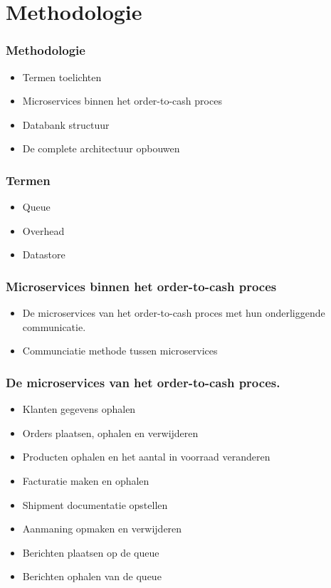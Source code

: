 \documentclass[aspectratio=169]{beamer}
\begin{document}
\section{Methodologie}

\begin{frame}
	\frametitle{Methodologie}
	\begin{itemize}
		\item Termen toelichten
		\item Microservices binnen het order-to-cash proces
		\item Databank structuur
		\item De complete architectuur opbouwen
	\end{itemize}

\end{frame}

\begin{frame}
	\frametitle{Termen}
	\begin{itemize}
		\item Queue
		\item Overhead
		\item Datastore
	\end{itemize}

\end{frame}

\begin{frame}
	\frametitle{Microservices binnen het order-to-cash proces}
	\begin{itemize}
		\item De microservices van het order-to-cash proces met hun onderliggende communicatie.
		\item Communciatie methode tussen microservices
	\end{itemize}
\end{frame}

\begin{frame}
	\frametitle{De microservices van het order-to-cash proces.}
	\begin{itemize}
		\item Klanten gegevens ophalen
		\item Orders plaatsen, ophalen en verwijderen
		\item Producten ophalen en het aantal in voorraad veranderen
		\item Facturatie maken en ophalen
		\item Shipment documentatie opstellen
		\item Aanmaning opmaken en verwijderen
		\item Berichten plaatsen op de queue
		\item Berichten ophalen van de queue
	\end{itemize}
\end{frame}
\end{document}
